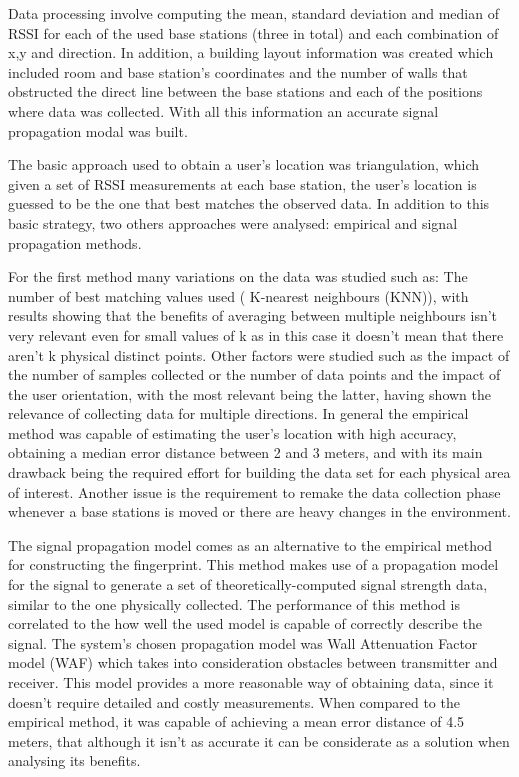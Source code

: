 Data processing involve computing the mean, standard deviation and median of \ac{RSSI} for each of the used base stations (three in total) and each combination of x,y and direction. In addition, a building layout information was created which included room and base station's coordinates and the number of walls that obstructed the direct line between the base stations and each of the positions where data was collected. With all this information an accurate signal propagation modal was built.

The basic approach used to obtain a user's location was triangulation, which given a set of \ac{RSSI} measurements at each base station, the user's location is guessed to be the one that best matches the observed data. In addition to this basic strategy, two others approaches were analysed: empirical and signal propagation methods. 

For the first method many variations on the data was studied such as: The number of best matching values used ( K-nearest neighbours (KNN)), with results showing that the benefits of averaging between multiple neighbours isn't very relevant even for small values of k as in this case it doesn't mean that there aren't k physical distinct points. Other factors were studied such as the impact of the number of samples collected or the number of data points and the impact of the user orientation, with the most relevant being the latter, having shown the relevance of collecting data for multiple directions. In general the empirical method was capable of estimating the user's location with high accuracy, obtaining a median error distance between 2 and 3 meters, and with its main drawback being the required effort for building the data set for each physical area of interest. Another issue is the requirement to remake the data collection phase whenever a base stations is moved or there are heavy changes in the environment.

The signal propagation model comes as an alternative to the empirical method for constructing the fingerprint. This method makes use of a propagation model for the signal to generate a set of theoretically-computed signal strength data, similar to the one physically collected. The performance of this method is correlated to the how well the used model is capable of correctly describe the signal. The system's chosen propagation model was Wall Attenuation Factor model (WAF) which takes into consideration obstacles between transmitter and receiver. This model provides a more reasonable way of obtaining data, since it doesn't require detailed and costly measurements. When compared to the empirical method, it was capable of achieving a mean error distance of 4.5 meters, that although it isn't as accurate it can be considerate as a solution when analysing its benefits.



